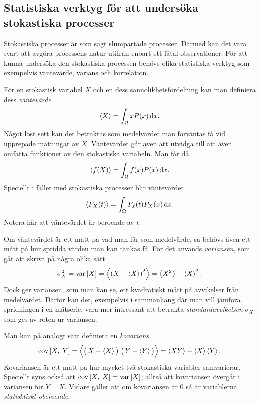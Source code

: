 \subsection{Statistiska verktyg för att undersöka stokastiska processer}
Stokastiska processer är som sagt slumpartade processer. Därmed kan
det vara svårt att avgöra processens natur utifrån enbart ett fåtal
observationer. För att kunna undersöka den stokastiska processen
behövs olika statistiska verktyg som exempelvis väntevärde, varians
och korrelation. 

För en stokastisk variabel $X$ och en dess sannolikhetsfördelning kan
man definiera dess \emph{väntevärde}
\begin{equation}\label{eq:EV}
    \ev{X} = \int_{\Omega} x P(x) \id{x}.
\end{equation}
Något löst sett kan det betraktas som medelvärdet man förväntas få vid
upprepade mätningar av $X$. 
Väntevärdet går även att utvidga till att även omfatta funktioner av
den stokastiska variabeln. Man får då 
\begin{equation}\label{eq:EV_f}
    \ev{f(X)} = \int_{\Omega} f(x) P(x) \id{x}.
\end{equation}
Speciellt i fallet med stokastiska processer blir väntevärdet 
\begin{equation}\label{eq:EV_process}
    \ev{F_X(t)} = \int_{\Omega} F_x(t)P_X(x) \id{x}.
\end{equation}
Notera här att väntevärdet är beroende av $t$. 

Om väntevärdet är ett mått på vad man får som medelvärde, så behövs
även ett mått på hur spridda värden man kan tänkas få. För det används
\emph{variansen}, som går att skriva på några olika sätt
\begin{equation}\label{eq:VAR}
\sigma_X^2=\VAR{X} = \ev{\left(X-\ev{X} \right)^2} = \ev{X^2}-\ev{X}^2.
\end{equation}
Dock ger variansen, som man kan se, ett kvadratiskt mått på
avvikelser från medelvärdet. Därför kan det, exempelvis i sammanhang
där man vill jämföra spridningen i en mätserie, vara mer intressant
att betrakta \emph{standardavvikelsen} $\sigma_X$ som ges av roten ur
variansen.

Man kan på analogt sätt definiera en \emph{kovarians}
\begin{equation}\label{eq:COV}
\COV{X}{Y} 
= \Big\langle \big(\, X-\ev{X}\big)\;\big(\, Y-\ev{Y}\big) \Big\rangle
= \ev{XY}-\ev{X}\ev{Y}.
\end{equation}
Kovariansen är ett mått på hur mycket två stokastiska variabler
samvarierar. Speciellt syns också att $\text{cov}\left[X,\;X\right]=\text{var}\left[X\right]$; alltså att
kovariansen övergår i variansen för $Y=X$. Vidare gäller att om
kovariansen är 0 så är variablerna \emph{statisktiskt oberoende}.

